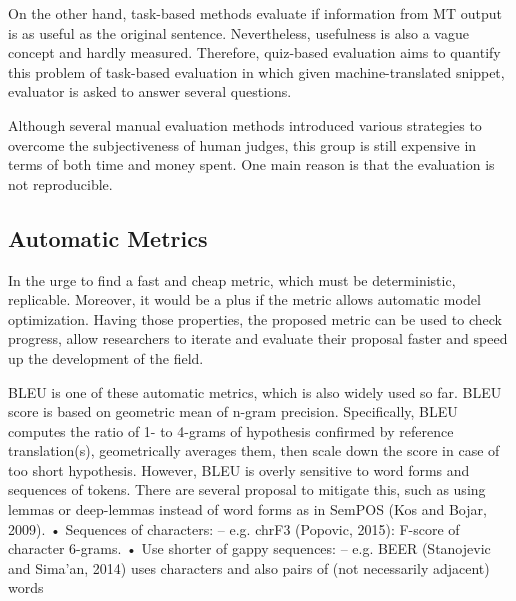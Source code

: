 On the other hand, task-based methods evaluate if information from MT output is as useful as the original sentence. Nevertheless, usefulness is also a vague concept and hardly measured. Therefore, quiz-based evaluation aims to quantify this problem of task-based evaluation in which given machine-translated snippet, evaluator is asked to answer several questions.


Although several manual evaluation methods introduced various strategies to overcome the subjectiveness of human judges, this group is still expensive in terms of both time and money spent. One main reason is that the evaluation is not reproducible. 

\subsection{Automatic Metrics}

In the urge to find a fast and cheap metric, which must be deterministic, replicable. Moreover, it would be a plus if the metric allows automatic model optimization.  
Having those properties, the proposed metric can be used to check progress, allow researchers to iterate and evaluate their proposal faster and speed up the development of the field.

BLEU \citep{BLEU} is one of these automatic metrics, which is also widely used so far. BLEU score is based on geometric mean of n-gram precision. Specifically, BLEU computes the ratio of 1- to 4-grams of hypothesis confirmed by reference translation(s), geometrically averages them, then scale down the score in case of too short hypothesis. However, BLEU is overly sensitive to word forms and sequences of tokens. There are several proposal to mitigate this, such as using lemmas or deep-lemmas instead of word forms as in SemPOS (Kos and Bojar, 2009).
• Sequences of characters:
– e.g. chrF3 (Popovic, 2015): F-score of character 6-grams.
• Use shorter of gappy sequences:
– e.g. BEER (Stanojevic and Sima’an, 2014) uses characters and also pairs
of (not necessarily adjacent) words

